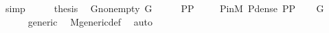\begin{isabellebody}
\ simp\isanewline
\ \ \isamarkupfalse%
\ \isamarkupfalse%
\ {\isacharquery}{\kern0pt}thesis\ \isacommand{{\isachardot}{\kern0pt}}\isamarkupfalse%
\isanewline
{}\isamarkupfalse%
%
\endisatagproof
{\isafoldproof}%
%
\isadelimproof
\isanewline
%
\endisadelimproof
\isanewline
{}\isamarkupfalse%
\ G{\isacharunderscore}{\kern0pt}nonempty{\isacharcolon}{\kern0pt}\ {\isachardoublequoteopen}G{\isasymnoteq}{}{\isachardoublequoteclose}\isanewline
%
\isadelimproof
%
\endisadelimproof
%
\isatagproof
{}\isamarkupfalse%
\ {\isacharminus}{\kern0pt}\isanewline
\ \ \isamarkupfalse%
\ {\isachardoublequoteopen}P{\isasymsubseteq}P{\isachardoublequoteclose}\ \isacommand{{\isachardot}{\kern0pt}{\isachardot}{\kern0pt}}\isamarkupfalse%
\isanewline
\ \ \isamarkupfalse%
\ P{\isacharunderscore}{\kern0pt}in{\isacharunderscore}{\kern0pt}M\ P{\isacharunderscore}{\kern0pt}dense\ {\isacartoucheopen}P{\isasymsubseteq}P{\isacartoucheclose}\isanewline
\ \ \isamarkupfalse%
\ {\isachardoublequoteopen}G\ {\isasymnoteq}\ {}{\isachardoublequoteclose}\isanewline
\ \ \ \ \isamarkupfalse%
\ generic\ \isamarkupfalse%
\ M{\isacharunderscore}{\kern0pt}generic{\isacharunderscore}{\kern0pt}def\ \isamarkupfalse%
\ auto\isanewline
{}\isamarkupfalse%
%
\endisatagproof
{\isafoldproof}%
%
\isadelimproof
\isanewline
%
\endisadelimproof
\isanewline
{}\isamarkupfalse%
\ \isanewline
%
\isadelimtheory
%
\endisadelimtheory
%
\isatagtheory
{}\isamarkupfalse%
%
\endisatagtheory
{\isafoldtheory}%
%
\isadelimtheory
%
\endisadelimtheory
%
\end{isabellebody}%
\endinput
